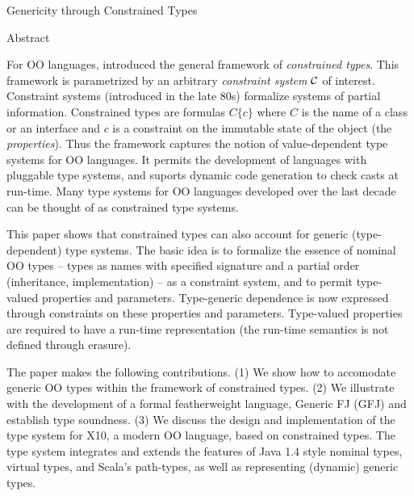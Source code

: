 Genericity through Constrained Types

Abstract

For OO languages, \cite{oopsla08} introduced the general framework of
{\em constrained types}. This framework is parametrized by an
arbitrary {\em constraint system} $\cal C$ of interest.  Constraint
systems (introduced in the late 80s) formalize systems of partial
information. Constrained types are formulas $C\{c\}$ where $C$ is the
name of a class or an interface and $c$ is a constraint on the
immutable state of the object (the {\em properties}). Thus the
framework captures the notion of value-dependent type systems for OO
languages. It permits the development of languages with pluggable type
systems, and suports dynamic code generation to check casts at
run-time.  Many type systems for OO languages developed over the last
decade can be thought of as constrained type systems.

This paper shows that constrained types can also account for generic
(type-dependent) type systems. The basic idea is to formalize the
essence of nominal OO types -- types as names with specified signature
and a partial order (inheritance, implementation) -- as a constraint
system, and to permit type-valued properties and
parameters. Type-generic dependence is now expressed through
constraints on these properties and parameters. Type-valued properties
are required to have a run-time representation (the run-time semantics
is not defined through erasure).

The paper makes the following contributions. (1) We show how to
accomodate generic OO types within the framework of constrained
types. (2) We illustrate with the development of a formal
featherweight language, Generic FJ (GFJ) and establish type
soundness. (3) We discuss the design and implementation of the type
system for X10, a modern OO language, based on constrained types. The
type system integrates and extends the features of Java 1.4 style
nominal types, virtual types, and Scala's path-types, as
well as representing (dynamic) generic types.

